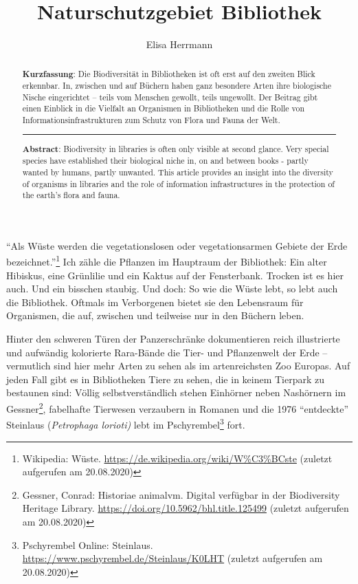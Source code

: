 \documentclass[a4paper,
fontsize=11pt,
oneside,
numbers=noperiodatend,
parskip=half-,
bibliography=totoc,
final
]{scrartcl}
\title{\LARGE{Naturschutzgebiet Bibliothek}}%
\author{Elisa Herrmann} %
\date{}
\begin{document}
\maketitle
\thispagestyle{fancyplain} 

\begin{abstract}
\noindent
\textbf{Kurzfassung}: Die Biodiversität in Bibliotheken ist oft erst auf
den zweiten Blick erkennbar. In, zwischen und auf Büchern haben ganz
besondere Arten ihre biologische Nische eingerichtet -- teils vom
Menschen gewollt, teils ungewollt. Der Beitrag gibt einen Einblick in
die Vielfalt an Organismen in Bibliotheken und die Rolle von
Informationsinfrastrukturen zum Schutz von Flora und Fauna der Welt.

\begin{center}\rule{0.5\linewidth}{0.5pt}\end{center}

\noindent
\textbf{Abstract}: Biodiversity in libraries is often only visible at
second glance. Very special species have established their biological
niche in, on and between books - partly wanted by humans, partly
unwanted. This article provides an insight into the diversity of
organisms in libraries and the role of information infrastructures in
the protection of the earth's flora and fauna.
\end{abstract}

\enquote{Als Wüste werden die vegetationslosen oder vegetationsarmen
Gebiete der Erde bezeichnet.}\footnote{Wikipedia: Wüste.
  \url{https://de.wikipedia.org/wiki/W\%C3\%BCste} (zuletzt aufgerufen
  am 20.08.2020)} Ich zähle die Pflanzen im Hauptraum der Bibliothek:
Ein alter Hibiskus, eine Grünlilie und ein Kaktus auf der Fensterbank.
Trocken ist es hier auch. Und ein bisschen staubig. Und doch: So wie die
Wüste lebt, so lebt auch die Bibliothek. Oftmals im Verborgenen bietet
sie den Lebensraum für Organismen, die auf, zwischen und teilweise nur
in den Büchern leben.

Hinter den schweren Türen der Panzerschränke dokumentieren reich
illustrierte und aufwändig kolorierte Rara-Bände die Tier- und
Pflanzenwelt der Erde -- vermutlich sind hier mehr Arten zu sehen als im
artenreichsten Zoo Europas. Auf jeden Fall gibt es in Bibliotheken Tiere
zu sehen, die in keinem Tierpark zu bestaunen sind: Völlig
selbstverständlich stehen Einhörner neben Nashörnern im
Gessner\footnote{Gessner, Conrad: Historiae animalvm. Digital verfügbar
  in der Biodiversity Heritage Library.
  \url{https://doi.org/10.5962/bhl.title.125499} (zuletzt aufgerufen am
  20.08.2020)}, fabelhafte Tierwesen verzaubern in Romanen und die 1976
\enquote{entdeckte} Steinlaus (\emph{Petrophaga lorioti)} lebt im
Pschyrembel\footnote{Pschyrembel Online: Steinlaus.
  \url{https://www.pschyrembel.de/Steinlaus/K0LHT} (zuletzt aufgerufen
  am 20.08.2020)} fort.
\end{document}
